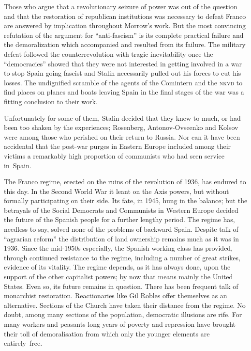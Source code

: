 Those who argue that a revolutionary seizure of power was out of the question and that the restoration of republican institutions was necessary to defeat Franco are answered by implication throughout Morrow’s work.%
But the most convincing refutation of the argument for ``anti-fascism'' is its complete practical failure and the demoralization which accompanied and resulted from its failure. The military defeat followed the counterrevolution with tragic inevitability once the ``democracies'' showed that they were not interested in getting involved in a war to stop Spain going fascist and Stalin necessarily pulled out his forces to cut his losses. The undignified scramble of the agents of the Comintern and the \textsc{nkvd} to find places on planes and boats leaving Spain in the final stages of the war was a fitting conclusion to their work. 

Unfortunately for some of them, Stalin decided that they knew to much, or had been too shaken by the experiences; Rosenberg, Antonov-Ovseenko and Kolsov were among those who perished on their return to Russia. Nor can it have been accidental that the post-war purges in Eastern Europe included among their victims a remarkably high proportion of communists who had seen service in~Spain.

The Franco regime, erected on the ruins of the revolution of 1936, has endured to this day. In the Second World War it leant on the Axis powers, but without formally participating on their side. Its fate, in 1945, hung in the balance; but the betrayals of the Social Democrats and Communists in Western Europe decided the future of the Spanish people for a further lengthy period. The regime has, needless to say, solved none of the problems of backward Spain. Despite talk of ``agrarian reform'' the distribution of land ownership remains much as it was in 1936. Since the mid-1950s especially, the Spanish working class has provided, through continued resistance to the regime, including a number of great strikes, evidence of its vitality. The regime depends, as it has always done, upon the support of the other capitalist powers; by now that means mainly the United States. Even so, its future remains in question. There has been frequent talk of monarchist restoration. Reactionaries like Gil Robles{\indexGRobles} offer themselves as an alternative. Sections of the Church have taken their distance from the regime. No doubt, among many sections of the population, democratic illusions are rife. For many workers and peasants long years of poverty and repression have brought their toll of demoralisation from which only the younger elements are entirely~free.

